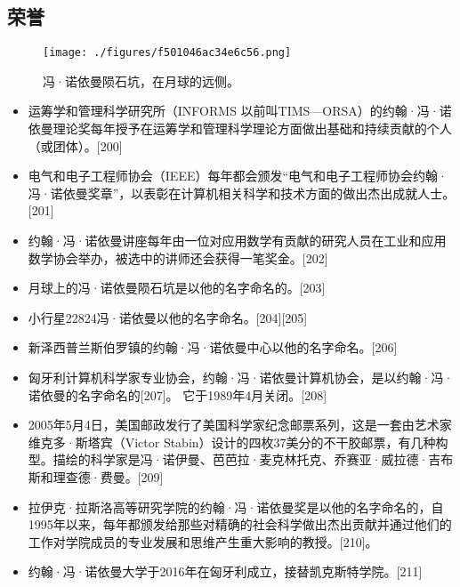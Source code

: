 \subsection{荣誉}
\begin{figure}[ht]
\centering
\texttt{[image: ./figures/f501046ac34e6c56.png]}
\caption{冯·诺依曼陨石坑，在月球的远侧。} \label{fig_von_12}
\end{figure}
\begin{itemize}
\item 运筹学和管理科学研究所（INFORMS 以前叫TIMS—ORSA）的约翰·冯·诺依曼理论奖每年授予在运筹学和管理科学理论方面做出基础和持续贡献的个人（或团体）。[200]
\item 电气和电子工程师协会（IEEE）每年都会颁发“电气和电子工程师协会约翰·冯·诺依曼奖章”，以表彰在计算机相关科学和技术方面的做出杰出成就人士。[201]
\item 约翰·冯·诺依曼讲座每年由一位对应用数学有贡献的研究人员在工业和应用数学协会举办，被选中的讲师还会获得一笔奖金。[202]
\item 月球上的冯·诺依曼陨石坑是以他的名字命名的。[203]
\item 小行星22824冯·诺依曼以他的名字命名。[204][205]
\item 新泽西普兰斯伯罗镇的约翰·冯·诺依曼中心以他的名字命名。[206]
\item 匈牙利计算机科学家专业协会，约翰·冯·诺依曼计算机协会，是以约翰·冯·诺依曼的名字命名的[207]。 它于1989年4月关闭。[208]
\item 2005年5月4日，美国邮政发行了美国科学家纪念邮票系列，这是一套由艺术家维克多·斯塔宾（Victor Stabin）设计的四枚37美分的不干胶邮票，有几种构型。描绘的科学家是冯·诺伊曼、芭芭拉·麦克林托克、乔赛亚·威拉德·吉布斯和理查德·费曼。[209]
\item 拉伊克·拉斯洛高等研究学院的约翰·冯·诺依曼奖是以他的名字命名的，自1995年以来，每年都颁发给那些对精确的社会科学做出杰出贡献并通过他们的工作对学院成员的专业发展和思维产生重大影响的教授。[210]。
\item 约翰·冯·诺依曼大学于2016年在匈牙利成立，接替凯克斯特学院。[211]
\end{itemize}

